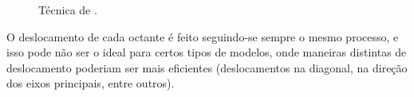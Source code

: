     \begin{figure}[!ht]
    \centering
    \qquad
    \caption{Técnica de \cite{bib:Lohner01}.}
    \label{fig:lohner}
    \end{figure}

O deslocamento de cada octante é feito seguindo-se sempre o mesmo processo, e isso pode não ser o ideal para certos tipos de modelos, onde maneiras distintas de deslocamento poderiam ser mais eficientes (deslocamentos na diagonal, na direção dos eixos principais, entre outros).

